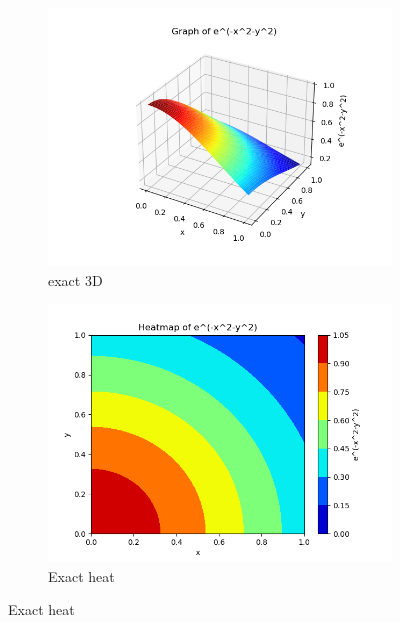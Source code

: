 \begin{figure}[H]
    \begin{subfigure}{0.5\textwidth}  
        \centering  
        \includegraphics[width=0.9\linewidth]{./pics/final/possion/2d/true3D.png}  
        \caption{exact 3D}  
    \end{subfigure}%
    \begin{subfigure}{0.5\textwidth}  
        \centering  
        \includegraphics[width=0.9\linewidth]{./pics/final/possion/2d/trueheat.png}  
        \caption{Exact heat}
    \end{subfigure} 
\end{figure} 

